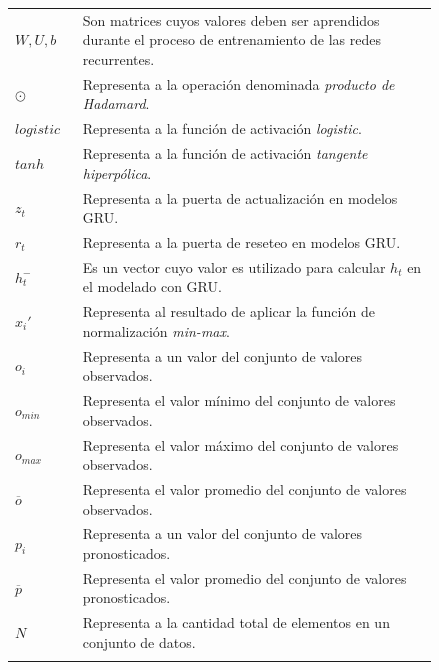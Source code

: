\begin{longtable}{lp{0.84\linewidth}}
    $W, U, b$ & Son matrices cuyos valores deben ser aprendidos durante el proceso de entrenamiento de las redes recurrentes. \\

    $\odot$ & Representa a la operación  denominada \textit{producto de Hadamard}. \\

    $logistic$ & Representa a la función de activación \textit{logistic}. \\

    $tanh$ & Representa a la función de activación \textit{tangente hiperpólica}. \\

    $z_{t}$ & Representa a la puerta de actualización en modelos GRU. \\

    $r_{t}$ & Representa a la puerta de reseteo en modelos GRU. \\

    $h^-_{t}$ & Es un vector cuyo valor es utilizado para calcular \(h_{t}\) en el modelado con GRU. \\

    $x_i'$ & Representa al resultado de aplicar la función de normalización \textit{min-max}. \\

    $o_i$ & Representa a un valor del conjunto de valores observados. \\

    $o_{min}$ & Representa el valor mínimo del conjunto de valores observados. \\

    $o_{max}$ & Representa el valor máximo del conjunto de valores observados. \\

    $\overline{o}$ & Representa el valor promedio del conjunto de valores observados. \\

    $p_i$ & Representa a un valor del conjunto de valores pronosticados. \\

    $\overline{p}$ & Representa el valor promedio del conjunto de valores pronosticados. \\

    $N$ & Representa a la cantidad total de elementos en un conjunto de datos.\\

        \\\hline 
    \end{longtable}